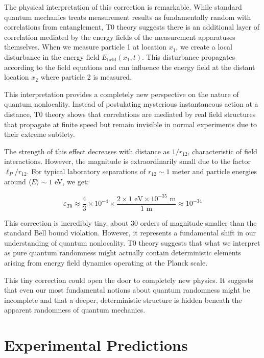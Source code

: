 \documentclass[12pt,a4paper]{article}
\theoremstyle{definition}
\theoremstyle{remark}
\begin{document}
The physical interpretation of this correction is remarkable. While standard quantum mechanics treats measurement results as fundamentally random with correlations from entanglement, T0 theory suggests there is an additional layer of correlation mediated by the energy fields of the measurement apparatuses themselves. When we measure particle 1 at location $x_1$, we create a local disturbance in the energy field $E_{\text{field}}(x_1, t)$. This disturbance propagates according to the field equations and can influence the energy field at the distant location $x_2$ where particle 2 is measured.

This interpretation provides a completely new perspective on the nature of quantum nonlocality. Instead of postulating mysterious instantaneous action at a distance, T0 theory shows that correlations are mediated by real field structures that propagate at finite speed but remain invisible in normal experiments due to their extreme subtlety.

The strength of this effect decreases with distance as $1/r_{12}$, characteristic of field interactions. However, the magnitude is extraordinarily small due to the factor $\ell_P/r_{12}$. For typical laboratory separations of $r_{12} \sim 1$ meter and particle energies around $\langle E \rangle \sim 1$ eV, we get:

\begin{equation}
	\varepsilon_{T0} \approx \frac{4}{3} \times 10^{-4} \times \frac{2 \times 1 \text{ eV} \times 10^{-35} \text{ m}}{1 \text{ m}} \approx 10^{-34}
\end{equation}

This correction is incredibly tiny, about 30 orders of magnitude smaller than the standard Bell bound violation. However, it represents a fundamental shift in our understanding of quantum nonlocality. T0 theory suggests that what we interpret as pure quantum randomness might actually contain deterministic elements arising from energy field dynamics operating at the Planck scale.

This tiny correction could open the door to completely new physics. It suggests that even our most fundamental notions about quantum randomness might be incomplete and that a deeper, deterministic structure is hidden beneath the apparent randomness of quantum mechanics.

\section{Experimental Predictions}
\end{document}

